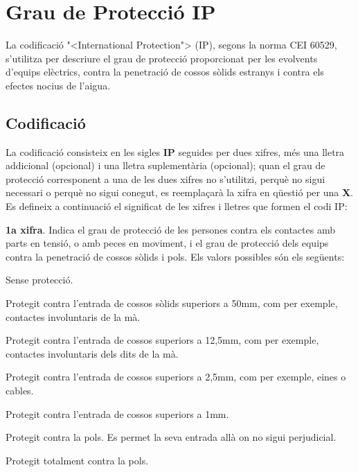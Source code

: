 \chapter{Grau de Protecci\'{o} IP}   

La codificaci\'{o} {"<}International Protection{">} (\textsf{IP}), segons la
norma \textsf{CEI 60529}, s'utilitza per descriure el grau de
protecci\'{o}  proporcionat per les evolvents d'equips el\`{e}ctrics, contra
la penetraci\'{o} de cossos s\`{o}lids estranys i contra els efectes nocius
de l'aigua.

\section{Codificaci\'{o}}
 La codificaci\'{o} consisteix en les sigles \textsf{\textbf{IP}}
seguides per dues xifres, m\'{e}s una lletra addicional (opcional) i una
lletra suplement\`{a}ria (opcional); quan el grau de protecci\'{o}
corresponent a una de les dues xifres no s'utilitzi, perqu\`{e} no sigui
necessari o perqu\`{e} no sigui conegut, es reempla\c{c}ar\`{a} la xifra en
q\"{u}esti\'{o} per una \textsf{\textbf{X}}. Es defineix a continuaci\'{o} el
significat de les xifres i lletres que formen el codi \textsf{IP}:

\textbf{1a xifra}. Indica el grau de protecci\'{o} de les persones contra els contactes amb
parts en tensi\'{o}, o amb peces en moviment, i el grau de protecci\'{o} dels equips contra la
penetraci\'{o} de cossos s\`{o}lids i pols. Els valors possibles s\'{o}n els seg\"{u}ents:
\begin{multicols}{2}
\begin{list}{}
   {\setlength{\labelwidth}{4.5mm} \setlength{\leftmargin}{4.5mm} \setlength{\labelsep}{2mm}}
   \item[\textbf{0}] Sense protecci\'{o}.
   \item[\textbf{1}] Protegit contra l'entrada de cossos s\`{o}lids superiors a 50\unit{mm},
   com per exemple,   contactes involuntaris de la m\`{a}.
   \item[\textbf{2}] Protegit contra l'entrada de cossos superiors a 12,5\unit{mm}, com per exemple,
   contactes involuntaris dels dits de la m\`{a}.
   \item[\textbf{3}] Protegit contra l'entrada de cossos superiors a 2,5\unit{mm},
   com per exemple, eines o cables.
   \item[\textbf{4}] Protegit contra l'entrada de cossos superiors a 1\unit{mm}.
   \item[\textbf{5}] Protegit contra la pols. Es permet la seva entrada all\`{a} on no sigui perjudicial.
   \item[\textbf{6}] Protegit totalment contra la pols.
\end{list}
\end{multicols}

